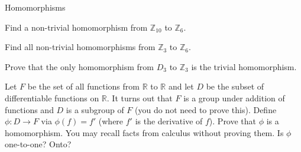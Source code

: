 \begin{section}{Homomorphisms}
\begin{exercise}
Find a non-trivial homomorphism from $\mathbb{Z}_{10}$ to $\mathbb{Z}_6$.
\end{exercise}

\begin{exercise}
Find all non-trivial homomorphisms from $\mathbb{Z}_3$ to $\mathbb{Z}_6$.
\end{exercise}

\begin{problem}
Prove that the only homomorphism from $D_3$ to $\mathbb{Z}_3$ is the trivial homomorphism.
\end{problem}

\begin{exercise}
Let $F$ be the set of all functions from $\mathbb{R}$ to $\mathbb{R}$ and let $D$ be the subset of differentiable functions on $\mathbb{R}$.  It turns out that $F$ is a group under addition of functions and $D$ is a subgroup of $F$ (you do not need to prove this). Define $\phi:D\to F$ via $\phi(f)=f'$ (where $f'$ is the derivative of $f$). Prove that $\phi$ is a homomorphism.  You may recall facts from calculus without proving them. Is $\phi$ one-to-one? Onto? 
\end{exercise}

\end{section}

